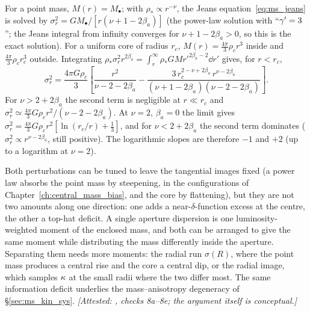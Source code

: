 For a point mass, $M(r)=M_\bullet$; with $\rho_\ast\propto r^{-\nu}$, the Jeans
equation~\eqref{eq:ms_jeans} is solved by
$\sigma_r^2=GM_\bullet/[r(\nu+1-2\beta_a)]$ (the power-law solution with
``$\gamma'=3$''; the Jeans integral from infinity converges for
$\nu+1-2\beta_a>0$, so this is the exact solution).  For a uniform core of
radius $r_c$, $M(r)=\tfrac{4\pi}{3}\rho_cr^3$ inside and
$\tfrac{4\pi}{3}\rho_cr_c^3$ outside.  Integrating
$\rho_\ast\sigma_r^2r^{2\beta_a}=\int_r^\infty\rho_\ast GMr'^{2\beta_a-2}\dd r'$
gives, for $r<r_c$,
\[
\sigma_r^2=\frac{4\pi G\rho_c}{3}\left[\frac{r^2}{\nu-2-2\beta_a}
-\frac{3\,r_c^{2-\nu+2\beta_a}\,r^{\nu-2\beta_a}}{(\nu+1-2\beta_a)(\nu-2-2\beta_a)}\right].
\]
For $\nu>2+2\beta_a$ the second term is negligible at $r\ll r_c$ and
$\sigma_r^2\simeq\tfrac{4\pi}{3}G\rho_cr^2/(\nu-2-2\beta_a)$.  At $\nu=2$,
$\beta_a=0$ the limit gives $\sigma_r^2=\tfrac{4\pi}{3}G\rho_cr^2[\ln(r_c/r)+\tfrac13]$,
and for $\nu<2+2\beta_a$ the second term dominates ($\sigma_r^2\propto r^{\nu-2\beta_a}$,
still positive).  The logarithmic slopes are
therefore $-1$ and $+2$ (up to a logarithm at $\nu=2$).

Both perturbations can be tuned to leave the tangential images fixed (a power
law absorbs the point mass by steepening, in the configurations of
Chapter~\ref{ch:central_mass_bias}, and the core by flattening), but they
are not two amounts along one direction: one adds a near-$\delta$-function
excess at the centre, the other a top-hat deficit.  A single aperture
dispersion is one luminosity-weighted moment of the enclosed mass, and both
can be arranged to give the same moment while distributing the mass
differently inside the aperture.  Separating them needs more moments: the
radial run $\sigma(R)$, where the point mass produces a central rise and the
core a central dip, or the radial image, which samples $\kappa$ at the small
radii where the two differ most.  The same information deficit underlies the
mass--anisotropy degeneracy of \S\ref{sec:ms_kin_sys}.
\emph{[Attested: , checks 8a--8e; the argument itself is conceptual.]}
